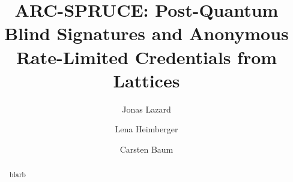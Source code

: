 \documentclass[sigconf]{acmart}
\title{ARC-SPRUCE: Post-Quantum Blind Signatures and  Anonymous Rate-Limited Credentials
from Lattices}
\author{Jonas Lazard \and Lena Heimberger \and Carsten Baum}
\affil{DTU Compute, Denmark}
\begin{document}
\maketitle

\begin{abstract}
    blarb
\end{abstract}











\appendix






\end{document}

